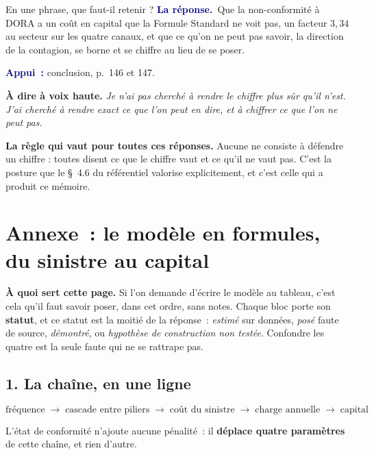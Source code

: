 \documentclass[11pt,a4paper]{article}
\newcommand{\laphrase}[1]{\begin{phrasebox}\textbf{À dire à voix haute.} \emph{#1}\end{phrasebox}}
\newcommand{\rep}[1]{\smallskip\noindent\textcolor{navy}{\textbf{La réponse.}}\ #1\par}
\newcommand{\appui}[1]{\smallskip\noindent\small\textcolor{navy}{\textbf{Appui~:}} #1\par\normalsize}
\begin{document}
\begin{question}{\og En une phrase, que faut-il retenir ?\fg{}}
\rep{Que la non-conformité à DORA a un coût en capital que la Formule Standard ne voit pas, un
facteur $3{,}34$ au secteur sur les quatre canaux, et que ce qu'on ne peut pas savoir, la direction
de la contagion, se borne et se chiffre au lieu de se poser.}
\appui{conclusion, p.~146 et 147.}
\end{question}

\laphrase{Je n'ai pas cherché à rendre le chiffre plus sûr qu'il n'est. J'ai cherché à rendre exact
ce que l'on peut en dire, et à chiffrer ce que l'on ne peut pas.}

\begin{cle}
\textbf{La règle qui vaut pour toutes ces réponses.} Aucune ne consiste à défendre un chiffre :
toutes disent ce que le chiffre vaut et ce qu'il ne vaut pas. C'est la posture que le \S~4.6 du
référentiel valorise explicitement, et c'est celle qui a produit ce mémoire.
\end{cle}

\newpage
\section*{Annexe~: le modèle en formules, du sinistre au capital}

\begin{cle}
\textbf{À quoi sert cette page.} Si l'on demande d'écrire le modèle au tableau, c'est cela qu'il
faut savoir poser, dans cet ordre, sans notes. Chaque bloc porte son \textbf{statut}, et ce statut
est la moitié de la réponse~: \emph{estimé} sur données, \emph{posé} faute de source,
\emph{démontré}, ou \emph{hypothèse de construction non testée}. Confondre les quatre est la
seule faute qui ne se rattrape pas.
\end{cle}

\subsection*{1. La chaîne, en une ligne}

\[
\text{fréquence} \;\longrightarrow\; \text{cascade entre piliers} \;\longrightarrow\;
\text{coût du sinistre} \;\longrightarrow\; \text{charge annuelle} \;\longrightarrow\;
\text{capital}
\]

\noindent L'état de conformité n'ajoute aucune pénalité~: il \textbf{déplace quatre paramètres} de
cette chaîne, et rien d'autre.
\end{document}
